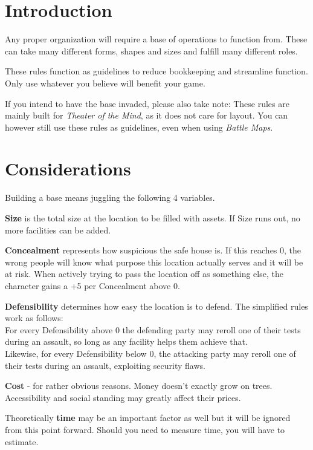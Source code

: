 \documentclass[12pt,a4paper,openany]{book}
\begin{document}
	

	\chapter{Introduction}
	Any proper organization will require a base of operations to function from. These can take many different forms, shapes and sizes and fulfill many different roles.
	\par
	These rules function as guidelines to reduce bookkeeping and streamline function. Only use whatever you believe will benefit your game.
	\par
	If you intend to have the base invaded, please also take note: These rules are mainly built for \emph{Theater of the Mind}, as it does not care for layout. You can however still use these rules as guidelines, even when using \emph{Battle Maps}.

	\chapter{Considerations}
	\vspace*{-10mm}
	Building a base means juggling the following 4 variables.\par
	\textbf{Size} is the total size at the location to be filled with assets. If Size runs out, no more facilities can be added.\par
	\textbf{Concealment} represents how suspicious the safe house is. If this reaches 0, the wrong people will know what purpose this location actually serves and it will be at risk.
	When actively trying to pass the location off as something else, the character gains a +5 per Concealment above 0.\par
	\textbf{Defensibility} determines how easy the location is to defend. The simplified rules work as follows:\\
	For every Defensibility above 0 the defending party may reroll one of their tests during an assault, so long as any facility helps them achieve that.\\
	Likewise, for every Defensibility below 0, the attacking party may reroll one of their tests during an assault, exploiting security flaws.\par
	\textbf{Cost} - for rather obvious reasons. Money doesn't exactly grow on trees. Accessibility and social standing may greatly affect their prices.\par
	Theoretically \textbf{time} may be an important factor as well but it will be ignored from this point forward. Should you need to measure time, you will have to estimate.
\end{document}
